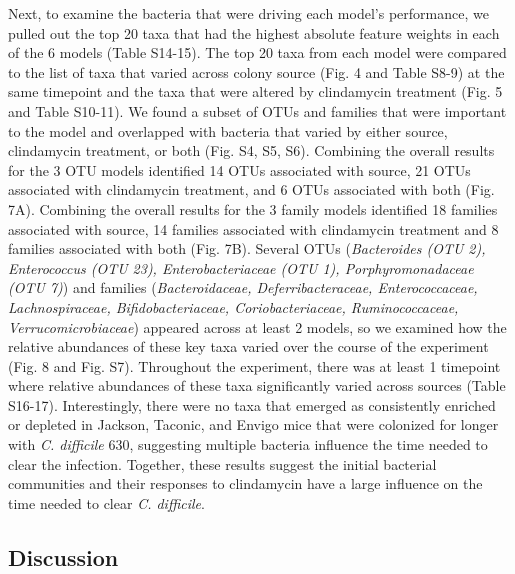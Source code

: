 \documentclass[11pt,]{article}
\begin{document}
Next, to examine the bacteria that were driving each model's
performance, we pulled out the top 20 taxa that had the highest absolute
feature weights in each of the 6 models (Table S14-15). The top 20 taxa
from each model were compared to the list of taxa that varied across
colony source (Fig. 4 and Table S8-9) at the same timepoint and the taxa
that were altered by clindamycin treatment (Fig. 5 and Table S10-11). We
found a subset of OTUs and families that were important to the model and
overlapped with bacteria that varied by either source, clindamycin
treatment, or both (Fig. S4, S5, S6). Combining the overall results for
the 3 OTU models identified 14 OTUs associated with source, 21 OTUs
associated with clindamycin treatment, and 6 OTUs associated with both
(Fig. 7A). Combining the overall results for the 3 family models
identified 18 families associated with source, 14 families associated
with clindamycin treatment and 8 families associated with both (Fig.
7B). Several OTUs (\emph{Bacteroides (OTU 2), Enterococcus (OTU 23),
Enterobacteriaceae (OTU 1), Porphyromonadaceae (OTU 7)}) and families
(\emph{Bacteroidaceae, Deferribacteraceae, Enterococcaceae,
Lachnospiraceae, Bifidobacteriaceae, Coriobacteriaceae, Ruminococcaceae,
Verrucomicrobiaceae}) appeared across at least 2 models, so we examined
how the relative abundances of these key taxa varied over the course of
the experiment (Fig. 8 and Fig. S7). Throughout the experiment, there
was at least 1 timepoint where relative abundances of these taxa
significantly varied across sources (Table S16-17). Interestingly, there
were no taxa that emerged as consistently enriched or depleted in
Jackson, Taconic, and Envigo mice that were colonized for longer with
\emph{C. difficile} 630, suggesting multiple bacteria influence the time
needed to clear the infection. Together, these results suggest the
initial bacterial communities and their responses to clindamycin have a
large influence on the time needed to clear \emph{C. difficile}.

\subsection{Discussion}\label{discussion}
\end{document}
